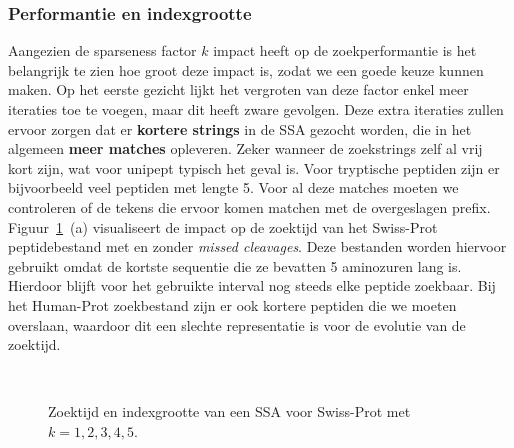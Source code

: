 \subsubsection{Performantie en indexgrootte}
Aangezien de sparseness factor $k$ impact heeft op de zoekperformantie is het belangrijk te zien hoe groot deze impact is, zodat we een goede keuze kunnen maken.
Op het eerste gezicht lijkt het vergroten van deze factor enkel meer iteraties toe te voegen, maar dit heeft zware gevolgen.
Deze extra iteraties zullen ervoor zorgen dat er \textbf{kortere strings} in de SSA gezocht worden, die in het algemeen \textbf{meer matches} opleveren.
Zeker wanneer de zoekstrings zelf al vrij kort zijn, wat voor unipept typisch het geval is.
Voor tryptische peptiden zijn er bijvoorbeeld veel peptiden met lengte 5.
Voor al deze matches moeten we controleren of de tekens die ervoor komen matchen met de overgeslagen prefix.
Figuur~\ref{fig:search_sparseness}~(a) visualiseert de impact op de zoektijd van het Swiss-Prot peptidebestand met en zonder \textit{missed cleavages}.
Deze bestanden worden hiervoor gebruikt omdat de kortste sequentie die ze bevatten 5 aminozuren lang is.
Hierdoor blijft voor het gebruikte interval nog steeds elke peptide zoekbaar.
Bij het Human-Prot zoekbestand zijn er ook kortere peptiden die we moeten overslaan, waardoor dit een slechte representatie is voor de evolutie van de zoektijd.
\\
\begin{figure}[H]
    \centering
    \\[4ex] %

    \caption{Zoektijd en indexgrootte van een SSA voor Swiss-Prot met $k = 1, 2, 3, 4, 5$.}\label{fig:search_sparseness}
\end{figure}

